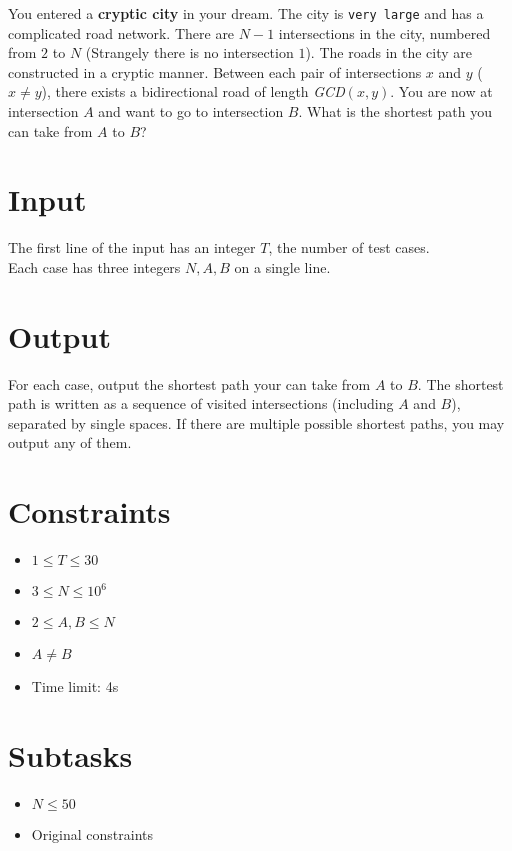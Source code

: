 
You entered a {\bf cryptic city} in your dream.
The city is {\tt very large} and has a complicated road network.
There are $N - 1$ intersections in the city, numbered from $2$ to $N$ (Strangely there is no intersection $1$).
The roads in the city are constructed in a cryptic manner.
Between each pair of intersections $x$ and $y$ ($x \neq y$), there exists a bidirectional road of length {\it GCD}$(x, y)$.
You are now at intersection $A$ and want to go to intersection $B$.
What is the shortest path you can take from $A$ to $B$?

\section*{Input}

The first line of the input has an integer $T$, the number of test cases.\\
Each case has three integers $N, A, B$ on a single line.

\section*{Output}

For each case, output the shortest path your can take from $A$ to $B$. The shortest path is written as a sequence of visited intersections (including $A$ and $B$), separated by single spaces. If there are multiple possible shortest paths, you may output any of them.

\section*{Constraints}
\begin{itemize}
\item $1 \leq T\leq 30$
\item $3 \leq N \leq 10^6$
\item $2 \leq A, B \leq N$
\item $A \neq B$
\item Time limit: 4s
\end{itemize}

\section*{Subtasks}
\begin{itemize}
  \item $N \leq 50$
  \item Original constraints
\end{itemize}

